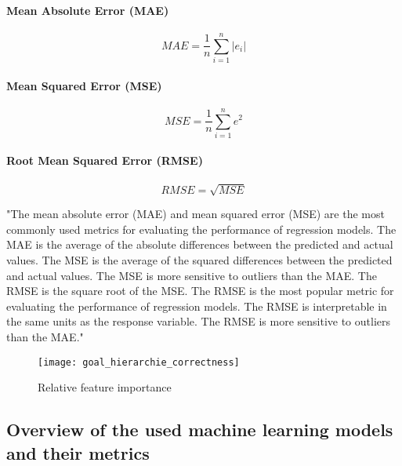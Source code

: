 \paragraph*{Mean Absolute Error (MAE)}

\begin{equation}
    \label{eq:mae}
    MAE = \frac{1}{n} \sum_{i=1}^{n} |e_i|
\end{equation}

\paragraph*{Mean Squared Error (MSE)}

\begin{equation}
    \label{eq:mse}
    MSE = \frac{1}{n} \sum_{i=1}^{n} e^2
\end{equation}

\paragraph*{Root Mean Squared Error (RMSE)}

\begin{equation}
    \label{eq:rmse}
    RMSE = \sqrt{MSE}
\end{equation}

"The mean absolute error (MAE) and mean squared error (MSE) are the most commonly used metrics for
evaluating the performance of regression models. The MAE is the average of the absolute differences between
the predicted and actual values. The MSE is the average of the squared differences between the predicted and
actual values. The MSE is more sensitive to outliers than the MAE. The RMSE is the square root of the MSE.
The RMSE is the most popular metric for evaluating the performance of regression models. The RMSE is
interpretable in the same units as the response variable. The RMSE is more sensitive to outliers than the MAE."


\begin{figure}[H]
    \centering
    \texttt{[image: goal\_hierarchie\_correctness]}
    \caption{Relative feature importance}
    \label{fig:goal_hierarchie_correctness}
\end{figure}


\subsection{Overview of the used machine learning models and their metrics}

